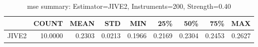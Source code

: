 \begin{table}[ht]
\centering
\caption{mse summary: Estimator=JIVE2, Instruments=200, Strength=0.40}
\begin{tabular}{lrrrrrrrr}
\toprule
 & COUNT & MEAN & STD & MIN & 25\% & 50\% & 75\% & MAX \\
\midrule
JIVE2 & 10.0000 & 0.2303 & 0.0213 & 0.1966 & 0.2169 & 0.2304 & 0.2453 & 0.2627 \\
\bottomrule
\end{tabular}
\end{table}
